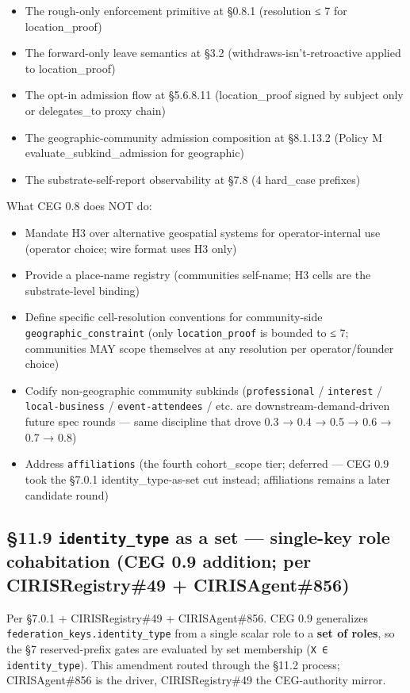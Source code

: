 \documentclass[11pt]{article}
\begin{document}
\begin{itemize}\setlength\itemsep{0pt}
\item The rough-only enforcement primitive at §0.8.1 (resolution ≤ 7 for location\_proof)
\item The forward-only leave semantics at §3.2 (withdraws-isn't-retroactive applied to location\_proof)
\item The opt-in admission flow at §5.6.8.11 (location\_proof signed by subject only or delegates\_to proxy chain)
\item The geographic-community admission composition at §8.1.13.2 (Policy M evaluate\_subkind\_admission for geographic)
\item The substrate-self-report observability at §7.8 (4 hard\_case prefixes)
\end{itemize}


What CEG 0.8 does NOT do:

\begin{itemize}\setlength\itemsep{0pt}
\item Mandate H3 over alternative geospatial systems for operator-internal use (operator choice; wire format uses H3 only)
\item Provide a place-name registry (communities self-name; H3 cells are the substrate-level binding)
\item Define specific cell-resolution conventions for community-side \texttt{geographic\_constraint} (only \texttt{location\_proof} is bounded to ≤ 7; communities MAY scope themselves at any resolution per operator/founder choice)
\item Codify non-geographic community subkinds (\texttt{professional} / \texttt{interest} / \texttt{local-business} / \texttt{event-attendees} / etc. are downstream-demand-driven future spec rounds — same discipline that drove 0.3 → 0.4 → 0.5 → 0.6 → 0.7 → 0.8)
\item Address \texttt{affiliations} (the fourth cohort\_scope tier; deferred — CEG 0.9 took the §7.0.1 identity\_type-as-set cut instead; affiliations remains a later candidate round)
\end{itemize}


\subsection*{§11.9 \texttt{identity\_type} as a set — single-key role cohabitation (CEG 0.9 addition; per CIRISRegistry\#49 + CIRISAgent\#856)}


Per §7.0.1 + CIRISRegistry\#49 + CIRISAgent\#856. CEG 0.9 generalizes \texttt{federation\_keys.identity\_type} from a single scalar role to a \textbf{set of roles}, so the §7 reserved-prefix gates are evaluated by set membership (\texttt{X ∈ identity\_type}). This amendment routed through the §11.2 process; CIRISAgent\#856 is the driver, CIRISRegistry\#49 the CEG-authority mirror.
\end{document}
